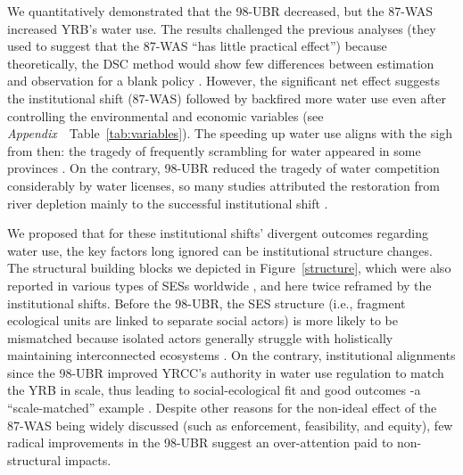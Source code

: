 
\label{discussion-1}
We quantitatively demonstrated that the 98-UBR decreased, but the 87-WAS increased YRB's water use.
The results challenged the previous analyses (they used to suggest that the 87-WAS ``has little practical effect'') because theoretically, the DSC method would show few differences between estimation and observation for a blank policy \cite{abadie2015,hill2021}.
However, the significant net effect suggests the institutional shift (87-WAS) followed by backfired more water use even after controlling the environmental and economic variables (see \textit{Appendix~}~Table~\ref{tab:variables}).
The speeding up water use aligns with the sigh from then: the tragedy of frequently scrambling for water appeared in some provinces \cite{mao2000}.
On the contrary, 98-UBR reduced the tragedy of water competition considerably by water licenses, so many studies attributed the restoration from river depletion mainly to the successful institutional shift \cite{chen2021,huangang2002,an2007}.

We proposed that for these institutional shifts' divergent outcomes regarding water use, the key factors long ignored can be institutional structure changes.
The structural building blocks we depicted in Figure~\ref{structure}, which were also reported in various types of SESs worldwide \cite{kluger2020,guerrero2015,bodin2012}, and here twice reframed by the institutional shifts.
Before the 98-UBR, the SES structure (i.e., fragment ecological units are linked to separate social actors) is more likely to be mismatched because isolated actors generally struggle with holistically maintaining interconnected ecosystems \cite{sayles2017,sayles2019,cai2016,bergsten2019}.
On the contrary, institutional alignments since the 98-UBR improved YRCC's authority in water use regulation to match the YRB in scale, thus leading to social-ecological fit and good outcomes -a ``scale-matched'' example \cite{cumming2020a,wang2019d}.
Despite other reasons for the non-ideal effect of the 87-WAS being widely discussed \cite{huangang2002} (such as enforcement, feasibility, and equity), few radical improvements in the 98-UBR suggest an over-attention paid to non-structural impacts.

